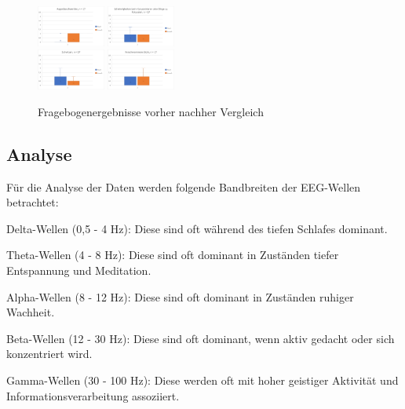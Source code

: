 \documentclass[conference]{IEEEtran}
\begin{document}
\begin{figure}[ht]
	\centering
	\includegraphics[width=0.2\textwidth]{assets/augenBesch.png} \hspace{-5pt}
	\includegraphics[width=0.2\textwidth]{assets/fokus.png} \\
	\vspace{2pt}
	\includegraphics[width=0.2\textwidth]{assets/schwitz.png} \hspace{-5pt}
	\includegraphics[width=0.2\textwidth]{assets/verschwSicht.png}
	\caption{Fragebogenergebnisse vorher nachher Vergleich}
	\label{fig:Fragebogenergebnisse}
\end{figure}

\subsection{Analyse}
Für die Analyse der Daten werden folgende Bandbreiten der EEG-Wellen betrachtet:
\begin{myitemize}
    \item Delta-Wellen (0,5 - 4 Hz): Diese sind oft während des tiefen Schlafes dominant.
    \item Theta-Wellen (4 - 8 Hz): Diese sind oft dominant in Zuständen tiefer Entspannung und Meditation.
    \item Alpha-Wellen (8 - 12 Hz): Diese sind oft dominant in Zuständen ruhiger Wachheit.
    \item Beta-Wellen (12 - 30 Hz): Diese sind oft dominant, wenn aktiv gedacht oder sich konzentriert wird.
    \item Gamma-Wellen (30 - 100 Hz): Diese werden oft mit hoher geistiger Aktivität und Informationsverarbeitung assoziiert.
\end{myitemize}
\end{document}
